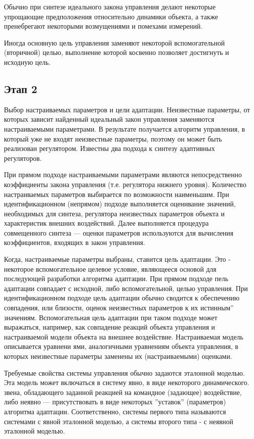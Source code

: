 \documentclass[a4paper,14pt]{extarticle} %
\begin{document}
Обычно при синтезе идеального закона управления делают некоторые упрощающие предположения относительно динамики объекта, а также пренебрегают некоторыми возмущениями и помехами измерений.

Иногда основную цель управления заменяют некоторой вспомогательной (вторичной) целью, выполнение которой косвенно позволяет достигнуть и исходную цель.

\subsection{Этап 2}
Выбор настраиваемых параметров и цели адаптации. Неизвестные параметры, от которых зависит найденный идеальный закон управления заменяются настраиваемыми параметрами. В результате получается алгоритм управления, в который уже не входят неизвестные параметры, поэтому он может быть реализован регулятором. Известны два подхода к синтезу адаптивных регуляторов.

При прямом подходе настраиваемыми параметрами являются непосредственно коэффициенты закона управления (т.е. регулятора нижнего уровня). Количество настраиваемых параметров выбирается по возможности наименьшим.
При идентификационном (непрямом) подходе выполняется оценивание значений, необходимых для синтеза, регулятора неизвестных параметров объекта и характеристик внешних
воздействий. Далее выполняется процедура совмещенного синтеза — оценки параметров используются для вычисления коэффициентов, входящих в закон управления.

Когда, настраиваемые параметры выбраны, ставится цель
адаптации. Это - некоторое вспомогательное целевое условие, являющееся основой для последующей разработки алгоритма адаптации. При прямом подходе пель адаптации
совпадает с исходной, либо вспомогательной, целью управления. При идентификационном подходе цель адаптации обычно сводится к обеспечению совпадения, или близости,
оценок неизвестных параметров к их истинным” значениям. Вспомогательная цель адаптации при таком подходе может выражаться, например, как совпадение реакций объекта управления и настраиваемой модели объекта на внешнее воздействие. Настраиваемая модель описывается уравнени ями, аналогичными уравнениям объекта управления, в которых неизвестные параметры заменены их (настраиваемыми) оценками.

Требуемые свойства системы управления обычно задаются эталонной моделью. Эта модель может включаться в систему явно, в виде некоторого динамического.
звена, обладающего заданной реакцией на командное (задающее) воздействие, либо неявно — присутствовать в виде некоторых ”уставок” (параметров) алгоритма адаптации. Соответственно, системы первого типа называются системами с явной эталонной моделью, а системы второго типа - с неявной эталонной моделью.
\end{document}
